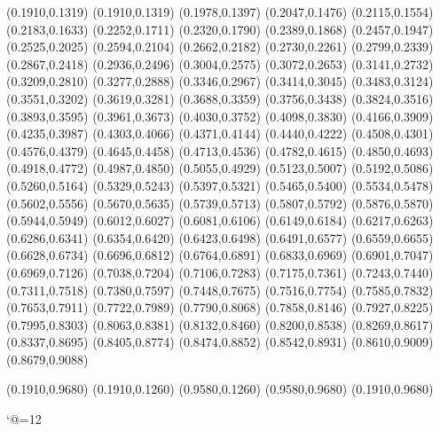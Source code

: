 \PST@Dotted(0.1910,0.1319)
(0.1910,0.1319)
(0.1978,0.1397)
(0.2047,0.1476)
(0.2115,0.1554)
(0.2183,0.1633)
(0.2252,0.1711)
(0.2320,0.1790)
(0.2389,0.1868)
(0.2457,0.1947)
(0.2525,0.2025)
(0.2594,0.2104)
(0.2662,0.2182)
(0.2730,0.2261)
(0.2799,0.2339)
(0.2867,0.2418)
(0.2936,0.2496)
(0.3004,0.2575)
(0.3072,0.2653)
(0.3141,0.2732)
(0.3209,0.2810)
(0.3277,0.2888)
(0.3346,0.2967)
(0.3414,0.3045)
(0.3483,0.3124)
(0.3551,0.3202)
(0.3619,0.3281)
(0.3688,0.3359)
(0.3756,0.3438)
(0.3824,0.3516)
(0.3893,0.3595)
(0.3961,0.3673)
(0.4030,0.3752)
(0.4098,0.3830)
(0.4166,0.3909)
(0.4235,0.3987)
(0.4303,0.4066)
(0.4371,0.4144)
(0.4440,0.4222)
(0.4508,0.4301)
(0.4576,0.4379)
(0.4645,0.4458)
(0.4713,0.4536)
(0.4782,0.4615)
(0.4850,0.4693)
(0.4918,0.4772)
(0.4987,0.4850)
(0.5055,0.4929)
(0.5123,0.5007)
(0.5192,0.5086)
(0.5260,0.5164)
(0.5329,0.5243)
(0.5397,0.5321)
(0.5465,0.5400)
(0.5534,0.5478)
(0.5602,0.5556)
(0.5670,0.5635)
(0.5739,0.5713)
(0.5807,0.5792)
(0.5876,0.5870)
(0.5944,0.5949)
(0.6012,0.6027)
(0.6081,0.6106)
(0.6149,0.6184)
(0.6217,0.6263)
(0.6286,0.6341)
(0.6354,0.6420)
(0.6423,0.6498)
(0.6491,0.6577)
(0.6559,0.6655)
(0.6628,0.6734)
(0.6696,0.6812)
(0.6764,0.6891)
(0.6833,0.6969)
(0.6901,0.7047)
(0.6969,0.7126)
(0.7038,0.7204)
(0.7106,0.7283)
(0.7175,0.7361)
(0.7243,0.7440)
(0.7311,0.7518)
(0.7380,0.7597)
(0.7448,0.7675)
(0.7516,0.7754)
(0.7585,0.7832)
(0.7653,0.7911)
(0.7722,0.7989)
(0.7790,0.8068)
(0.7858,0.8146)
(0.7927,0.8225)
(0.7995,0.8303)
(0.8063,0.8381)
(0.8132,0.8460)
(0.8200,0.8538)
(0.8269,0.8617)
(0.8337,0.8695)
(0.8405,0.8774)
(0.8474,0.8852)
(0.8542,0.8931)
(0.8610,0.9009)
(0.8679,0.9088)

\PST@Border(0.1910,0.9680)
(0.1910,0.1260)
(0.9580,0.1260)
(0.9580,0.9680)
(0.1910,0.9680)

\catcode`@=12
\fi
\endpspicture
